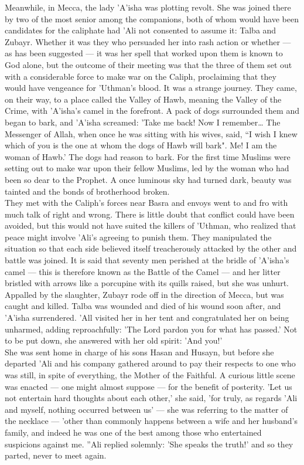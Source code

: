 \documentclass[10pt, twoside,openright]{book}
\begin{document}
Meanwhile, in Mecca, the lady 'A'isha was plotting revolt. She was joined there by two of the most senior among the companions, both of whom would have been candidates for the caliphate had 'Ali not consented to assume it: Talba and Zubayr. Whether it was they who persuaded her into rash action or whether --- as has been suggested --- it was her spell that worked upon them is known to God alone, but the outcome of their meeting was that the three of them set out with a considerable force to make war on the Caliph, proclaiming that they would have vengeance for 'Uthman's blood. It was a strange journey. They came, on their way, to a place called the Valley of Hawb, meaning the Valley of the Crime, with 'A'isha's camel in the forefront. A pack of dogs surrounded them and began to bark, and 'A'isha screamed: 'Take me back! Now I remember\ldots{} The Messenger of Allah, when once he was sitting with his wives, said, ``I wish I knew which of you is the one at whom the dogs of Hawb will bark". Me! I am the woman of Hawb.' The dogs had reason to bark. For the first time Muslims were setting out to make war upon their fellow Muslims, led by the woman who had been so dear to the Prophet. A once luminous sky had turned dark, beauty was tainted and the bonds of brotherhood broken. \\

They met with the Caliph's forces near Basra and envoys went to and fro with much talk of right and wrong. There is little doubt that conflict could have been avoided, but this would not have suited the killers of 'Uthman, who realized that peace might involve 'Ali's agreeing to punish them. They manipulated the situation so that each side believed itself treacherously attacked by the other and battle was joined. It is said that seventy men perished at the bridle of 'A'isha's camel --- this is therefore known as the Battle of the Camel --- and her litter bristled with arrows like a porcupine with its quills raised, but she was unhurt. Appalled by the slaughter, Zubayr rode off in the direction of Mecca, but was caught and killed. Talba was wounded and died of his wound soon after, and 'A'isha surrendered. 'All visited her in her tent and congratulated her on being unharmed, adding reproachfully: 'The Lord pardon you for what has passed.' Not to be put down, she answered with her old spirit: 'And you!' \\

She was sent home in charge of his sons Hasan and Husayn, but before she departed 'Ali and his company gathered around to pay their respects to one who was still, in spite of everything, the Mother of the Faithful. A curious little scene was enacted --- one might almost suppose --- for the benefit of posterity. 'Let us not entertain hard thoughts about each other,' she said, 'for truly, as regards 'Ali and myself, nothing occurred between us' --- she was referring to the matter of the necklace --- 'other than commonly happens between a wife and her husband's family, and indeed he was one of the best among those who entertained suspicions against me. ''Ali replied solemnly: 'She speaks the truth!' and so they parted, never to meet again. \\
\end{document}
